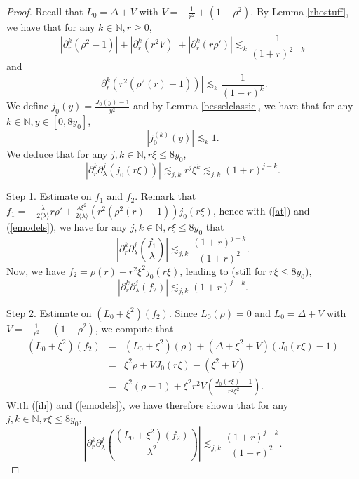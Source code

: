 \documentclass[11 pt]{amsart}
\theoremstyle{definition}
\theoremstyle{remark}
\numberwithin{equation}{section}
\begin{document}
\begin{proof}
  Recall that $L_0 = \Delta + V$ with $V = - \frac{1}{r^2} + (1 - \rho^2)$. By
  Lemma \ref{rhostuff}, we have that for any $k \in \mathbb{N}, r \geqslant
  0$,
  \begin{equation}
    | \partial_r^k (\rho^2 - 1) | + | \partial_r^k (r^2 V) | + | \partial_r^k
    (r \rho') | \lesssim_k \frac{1}{(1 + r)^{2 + k}} \label{ih}
  \end{equation}
  and
  \begin{equation}
    | \partial_r^k (r^2 (\rho^2 (r) - 1)) | \lesssim_k \frac{1}{(1 + r)^k} .
    \label{at}
  \end{equation}
  We define $j_0 (y) = \frac{J_0 (y) - 1}{y^2}$ and by Lemma
  \ref{besselclassic}, we have that for any $k \in \mathbb{N}, y \in [0, 8y_0]$,
  \[ | j_0^{(k)} (y) | \lesssim_k 1. \]
  We deduce that for any $j, k \in \mathbb{N}, r \xi \leqslant 8 y_0$,
  \begin{equation}
    | \partial_r^k \partial_{\lambda}^j (j_0 (r \xi)) | \lesssim_{j, k} r^j
    \xi^k \lesssim_{j, k} (1 + r)^{j - k} . \label{emodels}
  \end{equation}
  
\medskip
\noindent \underline{Step 1. Estimate on $f_1$ and $f_2$.} Remark that $f_1 = - \frac{\lambda}{2 \langle \lambda \rangle} r \rho' +
  \frac{\lambda \xi^2}{2 \langle \lambda \rangle} (r^2 (\rho^2 (r) - 1)) j_0
  (r \xi)$, hence with (\ref{at}) and (\ref{emodels}), we have for any $j, k
  \in \mathbb{N}, r \xi \leqslant 8 y_0$ that
  \[ \left| \partial_r^k \partial_{\lambda}^j \left( \frac{f_1}{\lambda}
     \right) \right| \lesssim_{j, k} \frac{(1 + r)^{j - k}}{(1 + r)^2} . \]
  Now, we have $f_2 = \rho (r) + r^2 \xi^2 j_0 (r \xi)$, leading to (still for
  $r \xi \leqslant 8 y_0$),
  \[ | \partial_r^k \partial_{\lambda}^j (f_2) | \lesssim_{j, k} (1 + r)^{j -
     k} . \]
  
\medskip
\noindent \underline{Step 2. Estimate on $(L_0 + \xi^2) (f_2)$.}
  Since $L_0 (\rho) = 0$ and $L_0 = \Delta + V$ with $V = - \frac{1}{r^2} +
  (1 - \rho^2)$, we compute that
  \begin{eqnarray*}
    (L_0 + \xi^2) (f_2) & = & (L_0 + \xi^2) (\rho) + (\Delta + \xi^2 + V) (J_0
    (r \xi) - 1)\\
    & = & \xi^2 \rho + V J_0 (r \xi) - (\xi^2 + V)\\
    & = & \xi^2 (\rho - 1) + \xi^2 r^2 V \left( \frac{J_0 (r \xi) - 1}{r^2
    \xi^2} \right) .
  \end{eqnarray*}
  With (\ref{ih}) and (\ref{emodels}), we have therefore shown that for any
  $j, k \in \mathbb{N}, r \xi \leqslant 8 y_0$,
  \[ \left| \partial_r^k \partial_{\lambda}^j \left( \frac{(L_0 + \xi^2)
     (f_2)}{\lambda^2} \right) \right| \lesssim_{j, k} \frac{(1 + r)^{j -
     k}}{(1 + r)^2} . \]
  

\end{proof}
\end{document}
